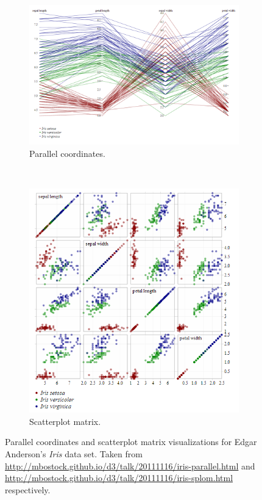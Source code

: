 \begin{figure}
	\centering
	\begin{subfigure}[b]{0.6\textwidth}
					\centering
					\includegraphics[width=\textwidth]{img/parallel_coordinates}
					\caption{Parallel coordinates.}
					\label{figure:parallel_coordinates}
	\end{subfigure}%
	~ %
	\begin{subfigure}[b]{0.4\textwidth}
					\centering
					\includegraphics[width=\textwidth]{img/scatterplot_matrix}
					\caption{Scatterplot matrix.}
					\label{figure:scatterplot_matrix}
	\end{subfigure}
	\caption{Parallel coordinates and scatterplot matrix visualizations for Edgar Anderson's \emph{Iris} data set. Taken from \url{http://mbostock.github.io/d3/talk/20111116/iris-parallel.html} and \url{http://mbostock.github.io/d3/talk/20111116/iris-splom.html} respectively.}%
	\label{figure:geometrically_transformed_displays}%
\end{figure}
